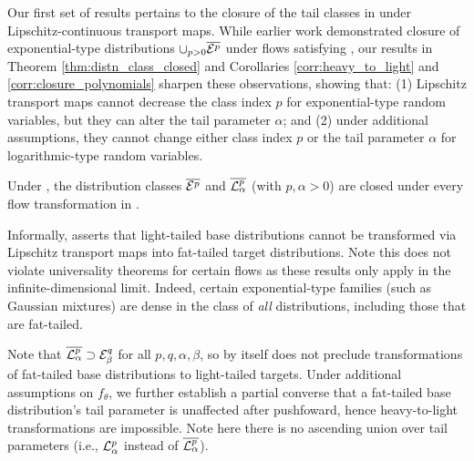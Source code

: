 \documentclass[thesis.tex]{subfiles}
\begin{document}
\vspace{-1mm}
Our first set of results pertains to the closure of the tail classes in 
under Lipschitz-continuous transport maps. While earlier work \citep{jaini2020tails} demonstrated
closure of exponential-type distributions $\cup_{p > 0} \overline{\mathcal{E}^p}$ under flows satisfying , our results in Theorem \ref{thm:distn_class_closed} and Corollaries \ref{corr:heavy_to_light} and \ref{corr:closure_polynomials} sharpen these observations, showing that: (1) Lipschitz transport maps cannot decrease the class index $p$ for exponential-type random variables, but they can alter the tail parameter $\alpha$; and
(2) under additional assumptions, they cannot change either class index $p$ or the tail parameter $\alpha$ for logarithmic-type random variables.

\begin{theorem}
  \label{thm:distn_class_closed}
  Under ,
  the distribution classes $\overline{\mathcal{E}^p}$
  and $\overline{\mathcal{L}^p_\alpha}$ (with $p,\alpha > 0$) are closed
  under every flow transformation in .
\end{theorem}

Informally,  asserts that light-tailed base distributions cannot be transformed
via Lipschitz transport maps into fat-tailed target distributions.
Note this does not violate universality theorems for certain flows \citep{huang2018neural}
as these results only apply in the infinite-dimensional limit. Indeed, certain exponential-type families (such as Gaussian mixtures) are dense in the class of \emph{all} distributions, including those that are fat-tailed.

Note that $\overline{\mathcal{L}^p_\alpha} \supset \mathcal{E}^q_\beta$ for all $p,q,\alpha,\beta$, so 
by itself does not preclude transformations of fat-tailed base distributions to light-tailed targets.
Under additional assumptions on $f_\theta$, we further establish a partial converse that a fat-tailed base distribution's tail parameter is unaffected after pushfoward,
hence heavy-to-light transformations are impossible. Note here there is no ascending union over
tail parameters (i.e., $\mathcal{L}^p_\alpha$ instead of $\overline{\mathcal{L}^p_\alpha}$).
\end{document}
